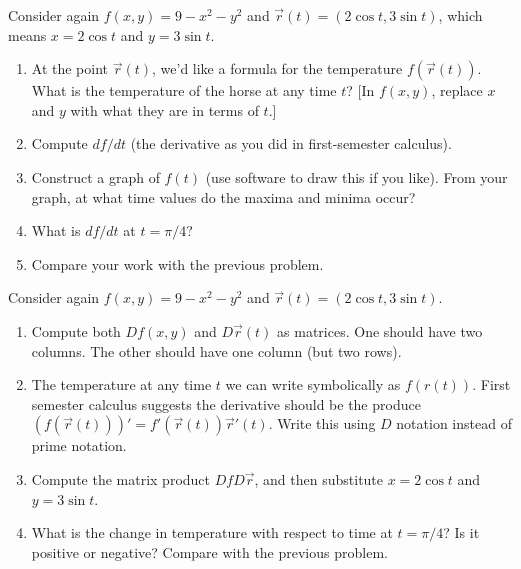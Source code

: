 \begin{problem}
 Consider again $f(x,y)=9-x^2-y^2$ and $\vec r(t)=(2\cos t, 3\sin t)$, which means $x=2\cos t$ and $y=3\sin t$. 
\begin{enumerate}
 \item At the point $\vec r(t)$, we'd like a formula for the temperature $f(\vec r(t))$. What is the temperature of the horse at any time $t$? [In $f(x,y)$, replace $x$ and $y$ with what they are in terms of $t$.]
 \item Compute $df/dt$ (the derivative as you did in first-semester calculus).
 \item Construct a graph of $f(t)$ (use software to draw this if you like). From your graph, at what time values do the maxima and minima occur?
 \item What is $df/dt$ at $t=\pi/4$?
 \item Compare your work with the previous problem.
\end{enumerate}
\end{problem}

\begin{problem}
 Consider again $f(x,y)=9-x^2-y^2$ and $\vec r(t)=(2\cos t, 3\sin t)$.
\begin{enumerate}
 \item Compute both $Df(x,y)$ and $D\vec r(t)$ as matrices. One should have two columns.  The other should have one column (but two rows). 
 \item The temperature at any time $t$ we can write symbolically as $f(r(t))$.  First semester calculus suggests the derivative should be the produce $(f(\vec r(t))) ' = f'(\vec r(t))\vec r'(t)$. Write this using $D$ notation instead of prime notation.
 \item Compute the matrix product $DfD\vec r$, and then substitute $x=2\cos t$ and $y=3\sin t$.    
 \item What is the change in temperature with respect to time at $t=\pi/4$? Is it positive or negative? Compare with the previous problem.
\end{enumerate}
\end{problem}


